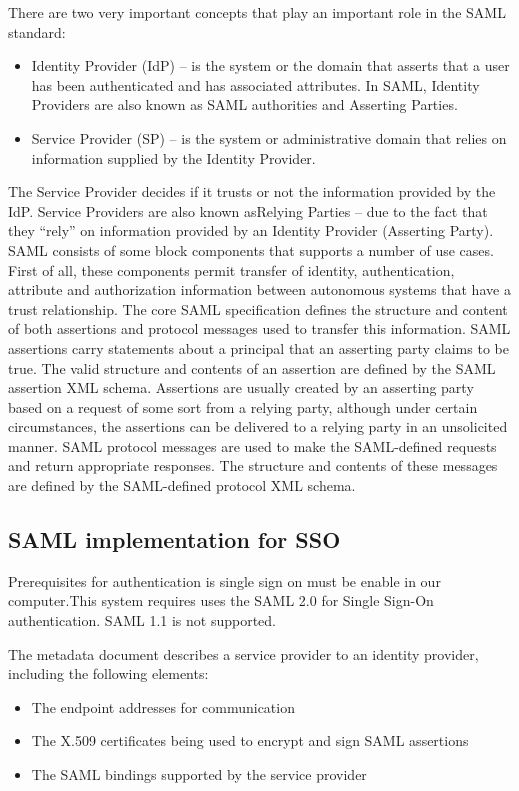 There are two very important concepts
that play an important role in the SAML
standard:
\begin{itemize}
\item Identity Provider (IdP) – is the
system or the domain that asserts
that a user has been authenticated
and has associated attributes. In
SAML, Identity Providers are also
known as SAML authorities and
Asserting Parties.
\item Service Provider (SP) – is the system
or administrative domain that relies
on information supplied by the
Identity Provider.
\end{itemize}
\par
The Service Provider decides if it trusts or not the information provided by the IdP. Service Providers are also known asRelying Parties – due to the fact that
they “rely” on information provided by
an Identity Provider (Asserting Party).
SAML consists of some block components that supports a number of use cases. First of all, these components permit transfer of identity, authentication, attribute
and authorization information between
autonomous systems that have a trust
relationship. The core SAML specification
defines the structure and content of both
assertions and protocol messages used
to transfer this information.
SAML assertions carry statements about
a principal that an asserting party claims
to be true. The valid structure and
contents of an assertion are defined by
the SAML assertion XML schema.
Assertions are usually created by an
asserting party based on a request of
some sort from a relying party, although under certain
circumstances, the assertions can be delivered to a relying party in an unsolicited manner. SAML
protocol messages are used to make the SAML-defined
requests and return appropriate responses. The structure and contents of these messages are
defined by the SAML-defined protocol XML schema.


\subsection{SAML implementation for SSO}
\hspace{5mm} Prerequisites for authentication is single sign on must be enable in our computer.This system requires uses the SAML 2.0 for Single Sign-On authentication. SAML 1.1 is not supported. 
\par The metadata document describes a service provider to an identity provider, including the following elements:
\begin{itemize}
    \item The endpoint addresses for communication
    \item The X.509 certificates being used to encrypt and sign SAML assertions
    \item The SAML bindings supported by the service provider
\end{itemize}

